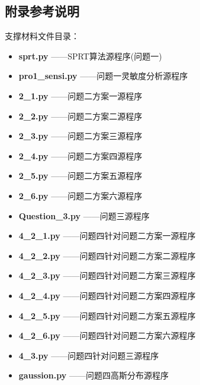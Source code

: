 \documentclass[withoutpreface,bwprint]{cumcmthesis} %
\begin{document}
\subsection{附录参考说明}
支撑材料文件目录：
\begin{itemize}
	\item \textbf{sprt.py} ——SPRT算法源程序(问题一)
	\item \textbf{pro1\_sensi.py} ——问题一灵敏度分析源程序
	\item \textbf{2\_1.py} ——问题二方案一源程序
	\item \textbf{2\_2.py} ——问题二方案二源程序
	\item \textbf{2\_3.py} ——问题二方案三源程序
	\item \textbf{2\_4.py} ——问题二方案四源程序
	\item \textbf{2\_5.py} ——问题二方案五源程序
	\item \textbf{2\_6.py} ——问题二方案六源程序
	\item \textbf{Question\_3.py} ——问题三源程序
	\item \textbf{4\_2\_1.py} ——问题四针对问题二方案一源程序
	\item \textbf{4\_2\_2.py} ——问题四针对问题二方案二源程序
	\item \textbf{4\_2\_3.py} ——问题四针对问题二方案三源程序
	\item \textbf{4\_2\_4.py} ——问题四针对问题二方案四源程序
	\item \textbf{4\_2\_5.py} ——问题四针对问题二方案五源程序
	\item \textbf{4\_2\_6.py} ——问题四针对问题二方案六源程序
	\item \textbf{4\_3.py} ——问题四针对问题三源程序
	\item \textbf{gaussion.py} ——问题四高斯分布源程序
\end{itemize}
\end{document}
